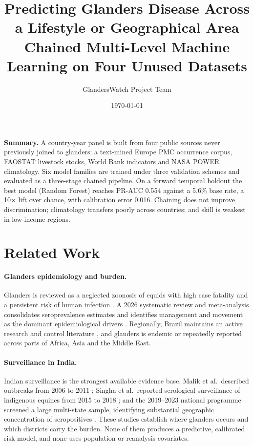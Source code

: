 \documentclass[11pt]{article}
\title{\textbf{Predicting Glanders Disease Across a Lifestyle or Geographical Area}\\[0.3em]
\large Chained Multi-Level Machine Learning on Four Unused Datasets}
\author{GlandersWatch Project Team}
\date{\today}
\begin{document}
\maketitle

\noindent
\textbf{Summary.} A country-year panel is built from four public sources never previously
joined to glanders: a text-mined Europe PMC occurrence corpus, FAOSTAT livestock stocks, World
Bank indicators and NASA POWER climatology. Six model families are trained under three validation
schemes and evaluated as a three-stage chained pipeline. On a forward temporal holdout the best
model (Random Forest) reaches PR-AUC 0.554 against a
5.6\% base rate, a 10$\times$ lift over chance, with calibration error 0.016.
Chaining does not improve discrimination; climatology transfers poorly across countries; and skill
is weakest in low-income regions.


\section{Related Work}
\label{sec:related}

\paragraph{Glanders epidemiology and burden.}
Glanders is reviewed as a neglected zoonosis of equids with high case fatality and a
persistent risk of human infection \cite{khan2013,kanani2026}. A 2026 systematic review
and meta-analysis consolidates seroprevalence estimates and identifies management and
movement as the dominant epidemiological drivers \cite{purnama2026}. Regionally, Brazil
maintains an active research and control literature \cite{mota2022}, and glanders is
endemic or repeatedly reported across parts of Africa, Asia and the Middle East.

\paragraph{Surveillance in India.}
Indian surveillance is the strongest available evidence base. Malik et al.\ described
outbreaks from 2006 to 2011 \cite{malik2012}; Singha et al.\ reported serological
surveillance of indigenous equines from 2015 to 2018 \cite{singha2020}; and the
2019--2023 national programme screened a large multi-state sample, identifying substantial
geographic concentration of seropositives \cite{singha2026}. These studies establish where
glanders occurs and which districts carry the burden. None of them produces a predictive,
calibrated risk model, and none uses population or reanalysis covariates.
\end{document}
